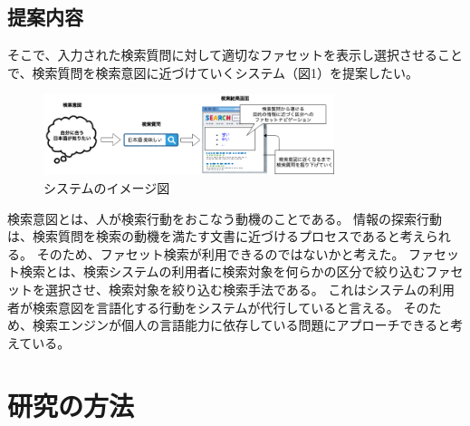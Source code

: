 \documentclass[a4j,10pt, twocolumn]{jarticle} \usepackage[dvipdfmx]{graphicx} \usepackage{amssymb} \usepackage{amsmath}
\begin{document}
\subsection{提案内容}

 そこで、入力された検索質問に対して適切なファセットを表示し選択させることで、検索質問を検索意図に近づけていくシステム（図1）を提案したい。

 \begin{figure}[ht]
   \includegraphics[width=85mm]{./new_ir_with_navi.png}
   \caption{システムのイメージ図}
 \end{figure}
 
 検索意図とは、人が検索行動をおこなう動機のことである。
 情報の探索行動は、検索質問を検索の動機を満たす文書に近づけるプロセスであると考えられる。
 そのため、ファセット検索が利用できるのではないかと考えた。
 ファセット検索とは、検索システムの利用者に検索対象を何らかの区分で絞り込むファセットを選択させ、検索対象を絞り込む検索手法である\cite{faceted}。
 これはシステムの利用者が検索意図を言語化する行動をシステムが代行していると言える。
 そのため、検索エンジンが個人の言語能力に依存している問題にアプローチできると考えている。
\section{研究の方法}
\end{document}
